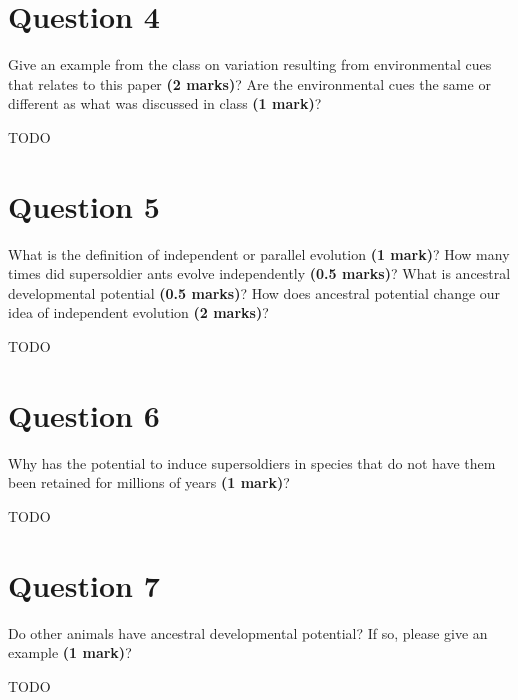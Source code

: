 \documentclass[letterpaper,12pt]{article}
\newenvironment{myindentpar}[1]%
{\begin{list}{}%
          {\setlength{\leftmargin}{#1}}%
          \item[]%
}
{\end{list}}
\begin{document}
\section{Question 4}

Give an example from the class on variation resulting from environmental cues that relates to this paper \textbf{(2 marks)}? Are the environmental cues the same or different as what was discussed in class \textbf{(1 mark)}?

\begin{myindentpar}{0.5cm}
TODO
\end{myindentpar}



\section{Question 5}

What is the definition of independent or parallel evolution \textbf{(1 mark)}? How many times did supersoldier ants evolve independently \textbf{(0.5 marks)}? What is ancestral developmental potential \textbf{(0.5 marks)}? How does ancestral potential change our idea of independent evolution \textbf{(2 marks)}?
\vspace*{20px}

\begin{myindentpar}{0.5cm}
TODO
\end{myindentpar}


\section{Question 6}

Why has the potential to induce supersoldiers in species that do not have them been retained for millions of years \textbf{(1 mark)}?
\vspace*{20px}

\begin{myindentpar}{0.5cm}
TODO
\end{myindentpar}



\section{Question 7}

Do other animals have ancestral developmental potential? If so, please give an example \textbf{(1 mark)}?
\vspace*{20px}

\begin{myindentpar}{0.5cm}
TODO
\end{myindentpar}
\end{document}
